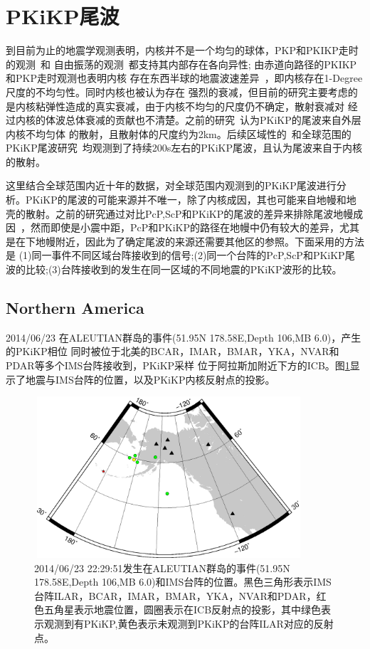 \newpage

\section{PKiKP尾波}


到目前为止的地震学观测表明，内核并不是一个均匀的球体，PKP和PKIKP走时的观测~\citep{Creager1992}和
自由振荡的观测~\citep{Tromp1993}都支持其内部存在各向异性; 由赤道向路径的PKIKP和PKP走时观测也表明内核
存在东西半球的地震波速差异~\citep{Tanaka1997}，即内核存在1-Degree尺度的不均匀性。同时内核也被认为存在
强烈的衰减，但目前的研究主要考虑的是内核粘弹性造成的真实衰减，由于内核不均匀的尺度仍不确定，散射衰减对
经过内核的体波总体衰减的贡献也不清楚。之前的研究~\citep{Vidale2000}认为PKiKP的尾波来自外层内核不均匀体
的散射，且散射体的尺度约为2km。后续区域性的~\citep{Poupinet2004}和全球范围的PKiKP尾波研究~\citep{Koper2004}均观测到了持续200s左右的PKiKP尾波，且认为尾波来自于内核的散射。

这里结合全球范围内近十年的数据，对全球范围内观测到的PKiKP尾波进行分析。PKiKP的尾波的可能来源并不唯一，除了内核成因，其也可能来自地幔和地壳的散射。之前的研究通过对比PcP,ScP和PKiKP的尾波的差异来排除尾波地幔成因~\citep{Koper2004}，然而即使是小震中距，PcP和PKiKP的路径在地幔中仍有较大的差异，尤其是在下地幔附近，因此为了确定尾波的来源还需要其他区的参照。下面采用的方法是
(1)同一事件不同区域台阵接收到的信号;(2)同一个台阵的PcP,ScP和PKiKP尾波的比较;(3)台阵接收到的发生在同一区域的不同地震的PKiKP波形的比较。

\subsection{Northern America}

2014/06/23 在ALEUTIAN群岛的事件(51.95N 178.58E,Depth 106,MB 6.0)，产生的PKiKP相位
同时被位于北美的BCAR，IMAR，BMAR，YKA，NVAR和PDAR等多个IMS台阵接收到，PKiKP采样
位于阿拉斯加附近下方的ICB。图\ref{alas}显示了地震与IMS台阵的位置，以及PKiKP内核反射点的投影。

\begin{figure}[!ht]
	\centering
	\includegraphics[height=6cm,width=10cm]{fig/chap3/ALAS.eps}
	\caption{2014/06/23 22:29:51发生在ALEUTIAN群岛的事件(51.95N 178.58E,Depth 106,MB%
6.0)和IMS台阵的位置。黑色三角形表示IMS台阵ILAR，BCAR，IMAR，BMAR，YKA，NVAR和PDAR，红色五角星表示地震位置，圆圈表示在ICB反射点的投影，其中绿色表示观测到有PKiKP,黄色表示未观测到PKiKP的台阵ILAR对应的反射点。}
	\label{alas}
\end{figure}

